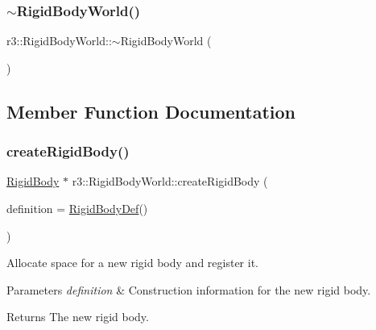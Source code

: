 \subsubsection{\texorpdfstring{$\sim$\+Rigid\+Body\+World()}{~RigidBodyWorld()}}
{\footnotesize\ttfamily r3\+::\+Rigid\+Body\+World\+::$\sim$\+Rigid\+Body\+World (\begin{DoxyParamCaption}{ }\end{DoxyParamCaption})\hspace{0.3cm}{\ttfamily [default]}}



\subsection{Member Function Documentation}
\mbox{\label{classr3_1_1_rigid_body_world_a647ca787c02a56c230eb5d50080b561d}} 
\subsubsection{\texorpdfstring{create\+Rigid\+Body()}{createRigidBody()}}
{\footnotesize\ttfamily \mbox{\hyperlink{classr3_1_1_rigid_body}{Rigid\+Body}} $\ast$ r3\+::\+Rigid\+Body\+World\+::create\+Rigid\+Body (\begin{DoxyParamCaption}\item[{\mbox{\hyperlink{structr3_1_1_rigid_body_def}{Rigid\+Body\+Def}}}]{definition = {\ttfamily \mbox{\hyperlink{structr3_1_1_rigid_body_def}{Rigid\+Body\+Def}}()} }\end{DoxyParamCaption})}



Allocate space for a new rigid body and register it. 


\begin{DoxyParams}{Parameters}
{\em definition} & Construction information for the new rigid body. \\
\hline
\end{DoxyParams}
\begin{DoxyReturn}{Returns}
The new rigid body. 
\end{DoxyReturn}
\mbox{\label{classr3_1_1_rigid_body_world_acdfd6a392a98366cd8414f7f6f50917f}} 
